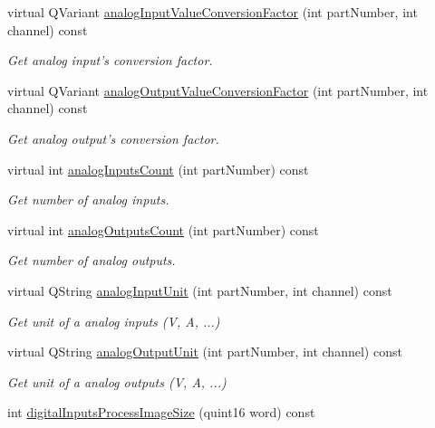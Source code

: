 \begin{DoxyCompactItemize}
virtual QVariant \hyperlink{classmdt_device_modbus_wago_module_a3567f225c332d4ce7dcc3cb724b8ad1f}{analogInputValueConversionFactor} (int partNumber, int channel) const 
\begin{DoxyCompactList}\small\item\em Get analog input's conversion factor. \end{DoxyCompactList}\item 
virtual QVariant \hyperlink{classmdt_device_modbus_wago_module_a8ce8e6ddebbf16db6bc2edbb7ef5d786}{analogOutputValueConversionFactor} (int partNumber, int channel) const 
\begin{DoxyCompactList}\small\item\em Get analog output's conversion factor. \end{DoxyCompactList}\item 
virtual int \hyperlink{classmdt_device_modbus_wago_module_a67b7c04870074112f45e99d8aa12879a}{analogInputsCount} (int partNumber) const 
\begin{DoxyCompactList}\small\item\em Get number of analog inputs. \end{DoxyCompactList}\item 
virtual int \hyperlink{classmdt_device_modbus_wago_module_ab97fe52c4538a80ccdf5fa1b04c119b6}{analogOutputsCount} (int partNumber) const 
\begin{DoxyCompactList}\small\item\em Get number of analog outputs. \end{DoxyCompactList}\item 
virtual QString \hyperlink{classmdt_device_modbus_wago_module_adbf2b96c5ab43a1693b5d656f84e893d}{analogInputUnit} (int partNumber, int channel) const 
\begin{DoxyCompactList}\small\item\em Get unit of a analog inputs (V, A, ...) \end{DoxyCompactList}\item 
virtual QString \hyperlink{classmdt_device_modbus_wago_module_a239892e92ee3f062e1000301766877aa}{analogOutputUnit} (int partNumber, int channel) const 
\begin{DoxyCompactList}\small\item\em Get unit of a analog outputs (V, A, ...) \end{DoxyCompactList}\item 
int \hyperlink{classmdt_device_modbus_wago_module_aec8434b67b73b60f218e0fe4abe0e553}{digitalInputsProcessImageSize} (quint16 word) const 

\end{DoxyCompactItemize}
